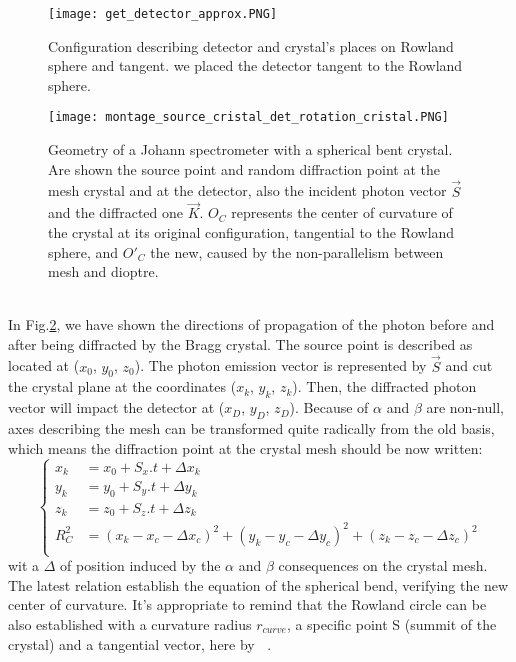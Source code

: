 \documentclass[a4paper,11pt,twoside,openright]{article}
\newcommand{\lt}{\left}
\newcommand{\rt}{\right}
\DeclareMathOperator{\ei}{\underline{e}_1}
\begin{document}
\begin{figure}[h]
    \centering
    \texttt{[image: get\_detector\_approx.PNG]}
    \caption{Configuration describing detector and crystal's places on Rowland sphere and tangent. we placed the detector tangent to the Rowland sphere.}
    \label{fig:rowland}
\end{figure}
\begin{figure}[h]
    \centering
    \texttt{[image: montage\_source\_cristal\_det\_rotation\_cristal.PNG]}
    \caption{Geometry of a Johann spectrometer with a spherical bent crystal. Are shown the source point and random diffraction point at the mesh crystal and at the detector, also the incident photon vector $\overrightarrow{S}$ and the diffracted one $\overrightarrow{K}$. $O_{C}$ represents the center of curvature of the crystal at its original configuration, tangential to the Rowland sphere, and $O'_{C}$ the new, caused by the non-parallelism between mesh and dioptre.}
    \label{fig:diffracted}
\end{figure}\\
In Fig.\ref{fig:diffracted},  we have shown the directions of propagation of the photon before and after being diffracted by the Bragg crystal. The source point is described as located at ($x_{0}$, $y_{0}$, $z_{0}$). The photon emission vector is represented by $\overrightarrow{S}$ and cut the crystal plane at the coordinates ($x_{k}$, $y_{k}$, $z_{k}$). Then, the diffracted photon vector will impact the detector at ($x_{D}$, $y_{D}$, $z_{D}$).
Because of $\alpha$ and $\beta$ are non-null, axes describing the mesh can be transformed quite radically from the old basis, which means the diffraction point at the crystal mesh should be now written:
$$
\lt\{
	\begin{array}{ll}
		x_{k} & = x_{0} + S_{x}.t + \Delta x_{k} \\
		y_{k} & = y_{0} + S_{y}.t + \Delta y_{k} \\
		z_{k} & = z_{0} + S_{z}.t + \Delta z_{k} \\
		R_{C}^{2} & = (x_{k}-x_{c}-\Delta  x_{c})^{2} + (y_{k}-y_{c}-\Delta  y_{c})^{2} + (z_{k}-z_{c}-\Delta  z_{c})^{2}\\
	\end{array}
\rt.
$$
wit a $\Delta$ of position induced by the $\alpha$ and $\beta$ consequences on the crystal mesh. The latest relation establish the equation of the spherical bend, verifying the new center of curvature. It's appropriate to remind that the Rowland circle can be also established with a curvature radius \textit{$r_{curve}$}, a specific point S (summit of the crystal) and a tangential vector, here by $\ei$.
\end{document}
